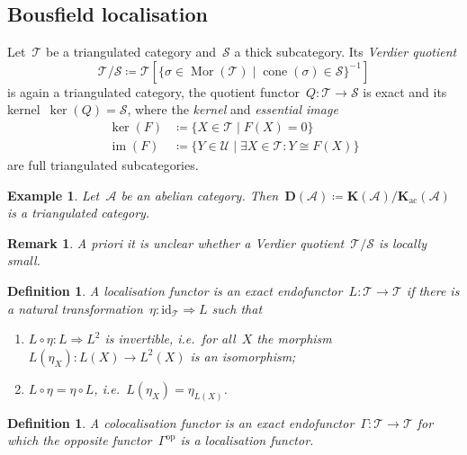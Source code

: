 \documentclass[10pt,a4paper]{article}
\theoremstyle{lecture}
\newtheorem{definition}[theorem]{Definition}
\newtheorem{example}[theorem]{Example}
\newtheorem{remark}[theorem]{Remark}
\newcommand\ac{\ensuremath{\mathrm{ac}}}
\newcommand\derived{\ensuremath{\mathbf{D}}}
\newcommand\identity{\ensuremath{\mathrm{id}}}
\newcommand\opp{\ensuremath{\mathrm{op}}}
\DeclareMathOperator\cone{cone}
\DeclareMathOperator\image{im}
\DeclareMathOperator\Mor{Mor}
\begin{document}
\subsection{Bousfield localisation}
Let~$\mathcal{T}$ be a triangulated category and~$\mathcal{S}$ a thick subcategory. Its \emph{Verdier quotient}
\begin{equation}
  \mathcal{T}/\mathcal{S}\coloneqq\mathcal{T}[\{\sigma\in\Mor(\mathcal{T})\mid\cone(\sigma)\in\mathcal{S}\}^{-1}]
\end{equation}
is again a triangulated category, the quotient functor~$Q\colon\mathcal{T}\to\mathcal{S}$ is exact and its kernel~$\ker(Q)=\mathcal{S}$, where the \emph{kernel} and \emph{essential image}
\begin{equation}
  \begin{aligned}
    \ker(F)&\coloneqq\{X\in\mathcal{T}\mid F(X)=0\} \\
    \image(F)&\coloneqq\{Y\in\mathcal{U}\mid \exists X\in\mathcal{T}\colon Y\cong F(X)\}
  \end{aligned}
\end{equation}
are full triangulated subcategories.
\begin{example}
  Let~$\mathcal{A}$ be an abelian category. Then~$\derived(\mathcal{A})\coloneqq\mathbf{K}(\mathcal{A})/\mathbf{K}_\ac(\mathcal{A})$ is a triangulated category.
\end{example}
\begin{remark}
  A priori it is unclear whether a Verdier quotient~$\mathcal{T}/\mathcal{S}$ is locally small.
\end{remark}
\begin{definition}
  A \emph{localisation functor} is an exact endofunctor~$L\colon\mathcal{T}\to\mathcal{T}$ if there is a natural transformation~$\eta\colon\identity_{\mathcal{T}}\Rightarrow L$ such that
  \begin{enumerate}
    \item $L\circ\eta\colon L\Rightarrow L^2$ is invertible, i.e.\ for all~$X$ the morphism~$L(\eta_X)\colon L(X)\to L^2(X)$ is an isomorphism;
    \item $L\circ\eta=\eta\circ L$, i.e.\ $L(\eta_X)=\eta_{L(X)}$.
  \end{enumerate}
\end{definition}
\begin{definition}
  A \emph{colocalisation functor} is an exact endofunctor~$\Gamma\colon\mathcal{T}\to\mathcal{T}$ for which the opposite functor~$\Gamma^\opp$ is a localisation functor.
\end{definition}
\end{document}
